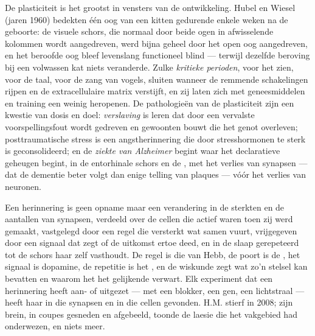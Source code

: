 \begin{definition}\label{def:b3:learning-memory:critical}
De plasticiteit is het grootst in vensters van de ontwikkeling. Hubel
en Wiesel (jaren 1960) bedekten één oog van een kitten gedurende enkele
weken na de geboorte: de visuele schors, die normaal door beide ogen in
afwisselende kolommen wordt aangedreven, werd bijna geheel door het
open oog aangedreven, en het beroofde oog bleef levenslang functioneel
blind --- terwijl dezelfde beroving bij een volwassen kat niets
veranderde. Zulke \emph{kritieke perioden}, voor het zien, voor de
taal, voor de zang van vogels, sluiten wanneer de remmende
schakelingen rijpen en de extracellulaire matrix verstijft, en zij
laten zich met geneesmiddelen en training een weinig heropenen. De
pathologieën van de plasticiteit zijn een kwestie van dosis en doel:
\emph{verslaving} is leren dat door een vervalste voorspellingsfout
wordt gedreven en gewoonten bouwt die het genot overleven;
posttraumatische stress is een angstherinnering die door stresshormonen
te sterk is geconsolideerd; en de \emph{ziekte van Alzheimer} begint
waar het declaratieve geheugen begint, in de entorhinale schors en de
, met het verlies van synapsen --- dat de dementie beter
volgt dan enige telling van plaques --- vóór het verlies van neuronen.
\end{definition}

\begin{remark}\label{rem:b3:learning-memory:what}
Een herinnering is geen opname maar een verandering in de sterkten en
de aantallen van synapsen, verdeeld over de cellen die actief waren
toen zij werd gemaakt, vastgelegd door een regel die versterkt wat
samen vuurt, vrijgegeven door een signaal dat zegt of de uitkomst
ertoe deed, en in de slaap gerepeteerd tot de schors haar zelf
vasthoudt. De regel is die van Hebb, de poort is de , het
signaal is dopamine, de repetitie is het , en de wiskunde
zegt wat zo'n stelsel kan bevatten en waarom het het gelijkende
verwart. Elk experiment dat een herinnering heeft aan- of uitgezet ---
met een blokker, een gen, een lichtstraal --- heeft haar in die
synapsen en in die cellen gevonden. H.M. stierf in 2008; zijn brein, in
coupes gesneden en afgebeeld, toonde de laesie die het vakgebied had
onderwezen, en niets meer.
\end{remark}

